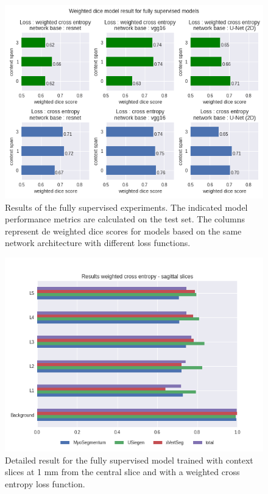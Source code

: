 \begin{figure}
    \centering
    \includegraphics[width=.95\textwidth]{images/FullySupervised.png}
    \caption{Results of the fully supervised experiments.
    The indicated model performance metrics are calculated on the test set.
    The columns represent de weighted dice scores for models based on the same network architecture with different loss functions.
    \label{fig:referenceExperiments}}
\end{figure}
\begin{figure}
    \centering
    \includegraphics[width=.95\textwidth]{images/full_perClass_perSource_weighted.png}
    \caption{Detailed result for the fully supervised model trained with context slices at 1 mm from the central slice and with a weighted cross entropy loss function.
    \label{fig:referenceWeighted}}
\end{figure}
